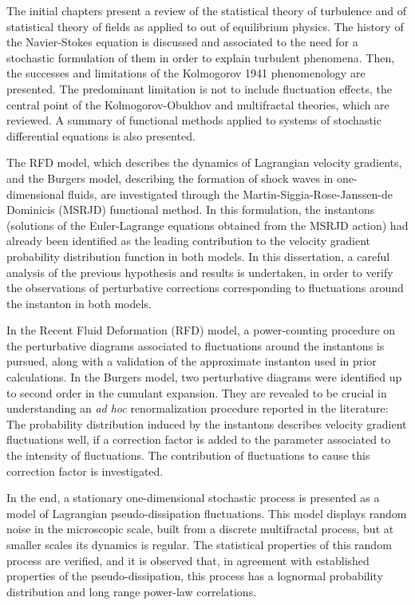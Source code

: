 \documentclass[brazil,12pt,a4paper,openany]{book}
\begin{document}
The initial chapters present a review of the statistical theory of turbulence and of statistical theory of fields as applied to out of equilibrium physics. The history of the Navier-Stokes equation is discussed and associated to the need for a stochastic formulation of them in order to explain turbulent phenomena. Then, the successes and limitations of the Kolmogorov 1941 phenomenology are presented. The predominant limitation is not to include fluctuation effects, the central point of the Kolmogorov-Obukhov and multifractal theories, which are reviewed. A summary of functional methods applied to systems of stochastic differential equations is also presented.

The RFD model, which describes the dynamics of Lagrangian velocity gradients, and the Burgers model, describing the formation of shock waves in one-dimensional fluids, are investigated through the Martin-Siggia-Rose-Janssen-de Dominicis (MSRJD) functional method. In this formulation, the instantons (solutions of the Euler-Lagrange equations obtained from the MSRJD action) had already been identified as the leading contribution to the velocity gradient probability distribution function in both models. In this dissertation, a careful analysis of the previous hypothesis and results is undertaken, in order to verify the observations of perturbative corrections corresponding to fluctuations around the instanton in both models.

In the Recent Fluid Deformation (RFD) model, a power-counting procedure on the perturbative diagrams associated to fluctuations around the instantons is pursued, along with a validation of the approximate instanton used in prior calculations. In the Burgers model, two perturbative diagrams were identified up to second order in the cumulant expansion. They are revealed to be crucial in understanding an \textit{ad hoc} renormalization procedure reported in the literature: The probability distribution induced by the instantons describes velocity gradient fluctuations well, if a correction factor is added to the parameter associated to the intensity of fluctuations. The contribution of fluctuations to cause this correction factor is investigated.

In the end, a stationary one-dimensional stochastic process is presented as a model of Lagrangian pseudo-dissipation fluctuations. This model displays random noise in the microscopic scale, built from a discrete multifractal process, but at smaller scales its dynamics is regular. The statistical properties of this random process are verified, and it is observed that, in agreement with established properties of the pseudo-dissipation, this process has a lognormal probability distribution and long range power-law correlations.
\end{document}
